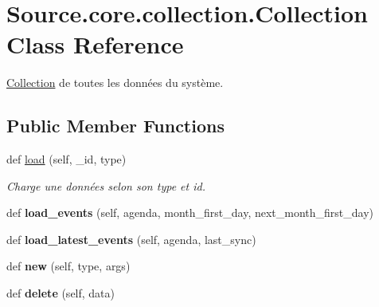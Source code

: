 \hypertarget{classSource_1_1core_1_1collection_1_1Collection}{}\section{Source.\+core.\+collection.\+Collection Class Reference}
\label{classSource_1_1core_1_1collection_1_1Collection}


\mbox{\hyperlink{classSource_1_1core_1_1collection_1_1Collection}{Collection}} de toutes les données du système.  


\subsection*{Public Member Functions}
\begin{DoxyCompactItemize}
\item 
def \mbox{\hyperlink{classSource_1_1core_1_1collection_1_1Collection_a916198d63b982729e8fd286414436392}{load}} (self, \+\_\+id, type)
\begin{DoxyCompactList}\small\item\em Charge une données selon son type et id. \end{DoxyCompactList}\item 
\mbox{\label{classSource_1_1core_1_1collection_1_1Collection_ae81f49621b4c1fbaa341cbef7c95d7b7}} 
def {\bfseries load\+\_\+events} (self, agenda, month\+\_\+first\+\_\+day, next\+\_\+month\+\_\+first\+\_\+day)
\item 
\mbox{\label{classSource_1_1core_1_1collection_1_1Collection_aef2f107a35b1a896a196772fc0d4cc7b}} 
def {\bfseries load\+\_\+latest\+\_\+events} (self, agenda, last\+\_\+sync)
\item 
\mbox{\label{classSource_1_1core_1_1collection_1_1Collection_a42cd0fa5c539ebde2ca6c1449daa5e36}} 
def {\bfseries new} (self, type, args)
\item 
\mbox{\label{classSource_1_1core_1_1collection_1_1Collection_a3975c671f12597b018d0b9a036c43508}} 
def {\bfseries delete} (self, data)
\item 
\mbox{\label{classSource_1_1core_1_1collection_1_1Collection_ae3005c8d2ffe8eeeceef8876ba2ba436}} 

\end{DoxyCompactItemize}
